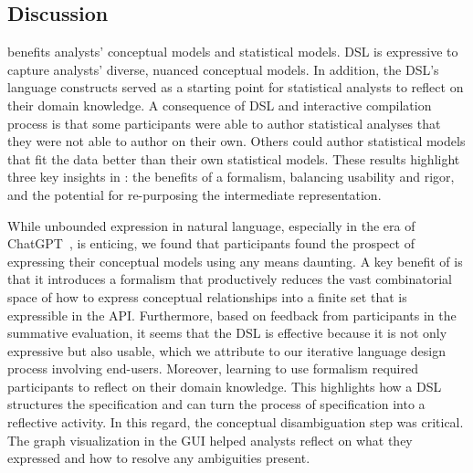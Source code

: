 \subsection{Discussion}
\rTisane benefits analysts' conceptual models and statistical models. \rTisanes
DSL is expressive to capture analysts' diverse, nuanced conceptual models. In
addition, the DSL's language constructs served as a starting point
for statistical analysts to reflect on their domain knowledge. A consequence of
\rTisanes DSL and interactive compilation process is that some participants
were able to author statistical analyses that they were not able to author on
their own. Others could author statistical models that fit the data better than
their own statistical models. These results highlight three key insights in
\rTisane: the benefits of a formalism, balancing usability and rigor, and the
potential for re-purposing the intermediate representation. 


While unbounded expression in natural language, especially in the era of
ChatGPT~\cite{brown2020language}, is enticing, we found that participants found
the prospect of expressing their conceptual models using any means daunting. A
key benefit of \rTisane is that it introduces a formalism that productively
reduces the vast combinatorial space of how to express conceptual
relationships into a finite set that is expressible in the API. Furthermore,
based on feedback from participants in the summative evaluation, it seems that
the DSL is effective because it is not only expressive but also usable, which we
attribute to our iterative language design process involving end-users.
Moreover, learning to use \rTisanes formalism required participants to reflect
on their domain knowledge. This highlights how a DSL structures the
specification and can turn the process of specification into a reflective
activity. In this regard, the conceptual disambiguation step was critical. The
graph visualization in the GUI helped analysts reflect on what they expressed
and how to resolve any ambiguities present. 


